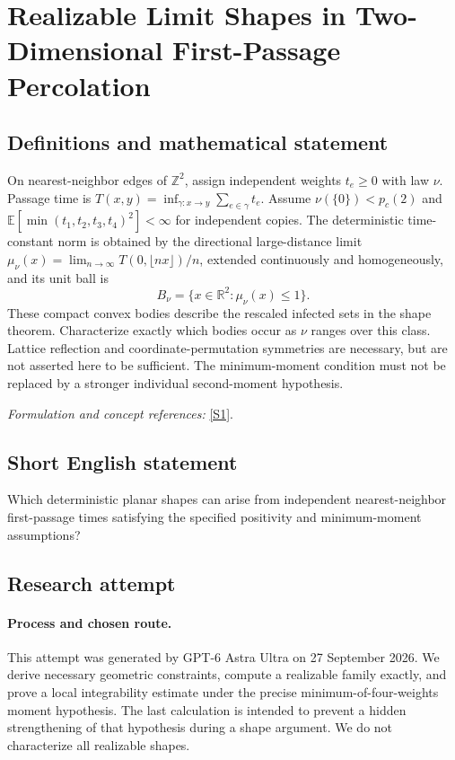 \documentclass[11pt]{article}
\begin{document}
\section*{\texorpdfstring{Realizable Limit Shapes in Two-Dimensional First-Passage Percolation}{Realizable Limit Shapes in Two-Dimensional First-Passage Percolation}}\label{422}
\subsection{Definitions and mathematical statement}
On nearest-neighbor edges of ${\mathbb{Z}}^2$, assign independent weights $t_e\ge0$ with law $\nu$. Passage time is $T(x,y)=\inf_{\gamma:x\to y}\sum_{e\in\gamma}t_e$. Assume $\nu(\{0\})<p_c(2)$ and ${\mathbb{E}}[\min(t_1,t_2,t_3,t_4)^2]<\infty$ for independent copies. The deterministic time-constant norm is obtained by the directional large-distance limit $\mu_\nu(x)=\lim_{n\to\infty}T(0,\lfloor nx\rfloor)/n$, extended continuously and homogeneously, and its unit ball is
\[
 B_\nu=\{x\in{\mathbb{R}}^2:\mu_\nu(x)\le1\}.
\]
These compact convex bodies describe the rescaled infected sets in the shape theorem. Characterize exactly which bodies occur as $\nu$ ranges over this class. Lattice reflection and coordinate-permutation symmetries are necessary, but are not asserted here to be sufficient. The minimum-moment condition must not be replaced by a stronger individual second-moment hypothesis.
\par\smallskip\textit{Formulation and concept references:} \href{https://sites.math.duke.edu/~rtd/FPP/50yrsFPP.pdf}{[S1]}.

\subsection{Short English statement}
Which deterministic planar shapes can arise from independent nearest-neighbor first-passage times satisfying the specified positivity and minimum-moment assumptions?
\subsection{Research attempt}
\paragraph{Process and chosen route.}
This attempt was generated by GPT-6 Astra Ultra on 27 September 2026. We derive necessary geometric constraints, compute a realizable family exactly, and prove a local integrability estimate under the precise minimum-of-four-weights moment hypothesis. The last calculation is intended to prevent a hidden strengthening of that hypothesis during a shape argument. We do not characterize all realizable shapes.
\end{document}
